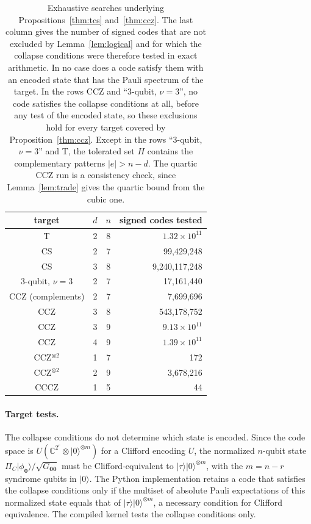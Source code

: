 \documentclass[aps,prl,reprint,twocolumn,amsmath,amssymb,floatfix,nofootinbib,superscriptaddress]{revtex4-2}
\begin{document}
\begin{table}[t]
\caption{Exhaustive searches underlying Propositions~\ref{thm:tcs} and~\ref{thm:ccz}. The last column gives the number of signed codes that are not excluded by Lemma~\ref{lem:logical} and for which the collapse conditions were therefore tested in exact arithmetic. In no case does a code satisfy them with an encoded state that has the Pauli spectrum of the target. In the rows CCZ and ``3-qubit, $\nu=3$'', no code satisfies the collapse conditions at all, before any test of the encoded state, so these exclusions hold for every target covered by Proposition~\ref{thm:ccz}. Except in the rows ``3-qubit, $\nu=3$'' and T, the tolerated set $H$ contains the complementary patterns $|e|>n-d$. The quartic CCZ run is a consistency check, since Lemma~\ref{lem:trade} gives the quartic bound from the cubic one.}
\label{tab:runs}
\begin{ruledtabular}
\begin{tabular}{cccr}
target & $d$ & $n$ & signed codes tested \\
\hline
T & 2 & 8 & $1.32\times10^{11}$ \\
CS & 2 & 7 & 99{,}429{,}248 \\
CS & 3 & 8 & 9{,}240{,}117{,}248 \\
3-qubit, $\nu=3$ & 2 & 7 & 17{,}161{,}440 \\
CCZ (complements) & 2 & 7 & 7{,}699{,}696 \\
CCZ & 3 & 8 & 543{,}178{,}752 \\
CCZ & 3 & 9 & $9.13\times10^{11}$ \\
CCZ & 4 & 9 & $1.39\times10^{11}$ \\
CCZ$^{\otimes2}$ & 1 & 7 & 172 \\
CCZ$^{\otimes2}$ & 2 & 9 & 3{,}678{,}216 \\
CCCZ & 1 & 5 & 44 \\
\end{tabular}
\end{ruledtabular}
\end{table}

\paragraph*{Target tests.}
The collapse conditions do not determine which state is encoded. Since the code space is $U(\mathbb C^{2^r}\otimes|0\rangle^{\otimes m})$ for a Clifford encoding $U$, the normalized $n$-qubit state $\Pi_C|\phi_{\mathbf0}\rangle/\sqrt{G_{\mathbf0\mathbf0}}$ must be Clifford-equivalent to $|\tau\rangle|0\rangle^{\otimes m}$, with the $m=n-r$ syndrome qubits in $|0\rangle$. The Python implementation retains a code that satisfies the collapse conditions only if the multiset of absolute Pauli expectations of this normalized state equals that of $|\tau\rangle|0\rangle^{\otimes m}$, a necessary condition for Clifford equivalence. The compiled kernel tests the collapse conditions only.
\end{document}
